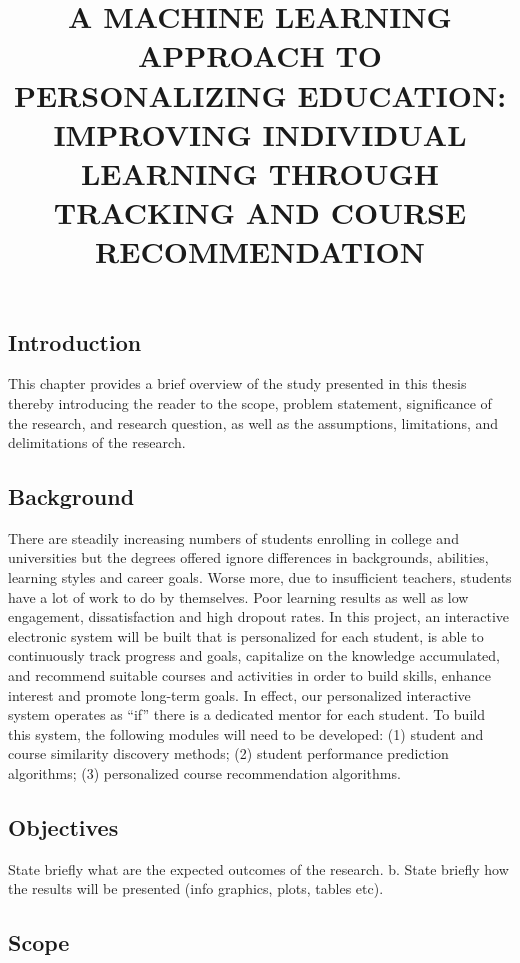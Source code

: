\documentclass{article}
\begin{document}
\title{A MACHINE LEARNING APPROACH TO PERSONALIZING EDUCATION: IMPROVING INDIVIDUAL LEARNING THROUGH TRACKING AND COURSE RECOMMENDATION}
\maketitle

\subsection{Introduction}
This chapter provides a brief overview of the study presented in this thesis thereby introducing the reader to the scope, problem statement, significance
of the research, and research question, as well as the assumptions, limitations, and delimitations of the research.

\subsection{Background}
There are steadily increasing numbers of students enrolling in college and universities but the degrees offered ignore differences in backgrounds, abilities, learning styles and career goals. Worse more, due to insufficient teachers, students have a lot of work to  do by themselves. Poor learning results as well as low engagement, dissatisfaction and high dropout rates. In this project, an interactive electronic system will be built that is personalized for each student, is able to continuously track progress and goals, capitalize on the knowledge accumulated, and recommend suitable courses and activities in order to build skills, enhance interest and promote  long-term goals. In effect, our personalized interactive system operates as “if” there is a dedicated mentor for each student. To build this system, the following modules will need to be developed: (1) student and course similarity discovery methods; (2) student performance prediction algorithms; (3) personalized course recommendation algorithms.

\subsection{Objectives}
State briefly what are the expected outcomes of the research. b. State briefly how the results will be presented (info graphics, plots, tables etc).

\subsection{Scope}
\end{document}
